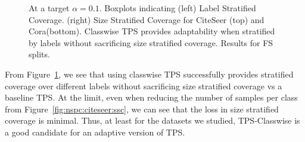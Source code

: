 \begin{figure}
\begin{subfigure}{0.48\linewidth}
     \end{subfigure}
     \caption{At a target $\alpha = 0.1$. Boxplots indicating (left) Label Stratified Coverage. (right) Size Stratified Coverage for CiteSeer (top) and Cora(bottom). Classwise TPS provides adaptability when stratified by labels without sacrificing size stratified coverage. Results for FS splits.}
     \label{fig:fs:conformal:citeseer_adaptability}
\end{figure}
From Figure~\ref{fig:fs:conformal:citeseer_adaptability}, we see that using classwise TPS successfully provides stratified coverage over different labels without sacrificing size stratified coverage vs a baseline TPS.
At the limit, even when reducing the number of samples per class from Figure~\ref{fig:nspc:citeseer:ssc}, we can see that the loss in size stratified coverage is minimal.
Thus, at least for the datasets we studied, TPS-Classwise is a good candidate for an adaptive version of TPS.
